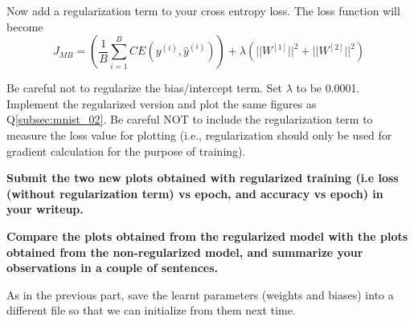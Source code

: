 \item {} 
\label{subsec:mnist_03}
Now add a regularization term to your cross entropy loss.
The loss function will become \begin{equation*}
  J_{MB} = \left(\frac{1}{B}\sum_{i=1}^{B}CE(y^{(i)}, \hat{y}^{(i)})\right) + \lambda \left(||W^{[1]}||^2 + ||W^{[2]}||^2 \right)
  \end{equation*}

Be careful not to regularize the bias/intercept term.
Set $\lambda$ to be 0.0001. Implement the regularized version and plot the same
figures as Q\ref{subsec:mnist_02}. Be careful NOT to include the regularization term to measure
the loss value for plotting (i.e., regularization should only be used for gradient calculation for
the purpose of training).

\textbf{Submit the two new plots obtained with regularized training (i.e loss (without regularization term) vs epoch, and accuracy vs epoch) in your writeup.}

\textbf{Compare the plots obtained from the regularized model with the plots obtained
from the non-regularized model, and summarize your observations in a couple of sentences.}

As in the previous part, save the learnt parameters (weights and biases) into a
different file so that we can initialize from them next time.

